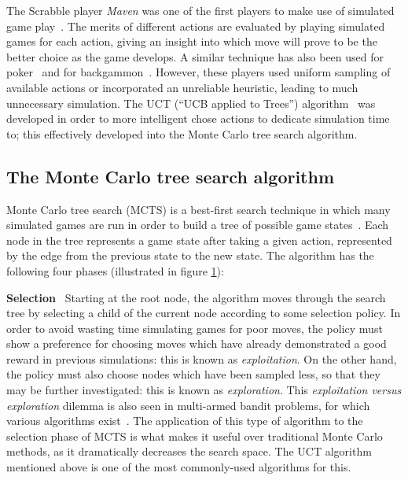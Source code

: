 The Scrabble player \emph{Maven} was one of the first players to make use of simulated game play~\citep{Sheppard2002}.  The merits of different actions are evaluated by playing simulated games for each action, giving an insight into which move will prove to be the better choice as the game develops.  A similar technique has also been used for poker~\citep{Billings2002} and for backgammon~\citep{Tesauro1996}.  However, these players used uniform sampling of available actions or incorporated an unreliable heuristic, leading to much unnecessary simulation.  The UCT (``UCB applied to Trees'') algorithm~\citep{Kocsis2006} was developed in order to more intelligent chose actions to dedicate simulation time to; this effectively developed into the Monte Carlo tree search algorithm.

\subsection{The Monte Carlo tree search algorithm}

\begin{figure}
\label{fig:MCTS}
\end{figure}

Monte Carlo tree search (MCTS) is a best-first search technique in which many simulated games are run in order to build a tree of possible game states~\citep{Chaslot2008}.  Each node in the tree represents a game state after taking a given action, represented by the edge from the previous state to the new state.  The algorithm has the following four phases (illustrated in figure \ref{fig:MCTS}):

\textbf{Selection} ~Starting at the root node, the algorithm moves through the search tree by selecting a child of the current node according to some selection policy.  In order to avoid wasting time simulating games for poor moves, the policy must show a preference for choosing moves which have already demonstrated a good reward in previous simulations: this is known as \emph{exploitation}.  On the other hand, the policy must also choose nodes which have been sampled less, so that they may be further investigated: this is known as \emph{exploration}.  This \emph{exploitation versus exploration} dilemma is also seen in multi-armed bandit problems, for which various algorithms exist~\citep{Auer2002}.  The application of this type of algorithm to the selection phase of MCTS is what makes it useful over traditional Monte Carlo methods, as it dramatically decreases the search space.  The UCT algorithm~\citep{Kocsis2006} mentioned above is one of the most commonly-used algorithms for this.

